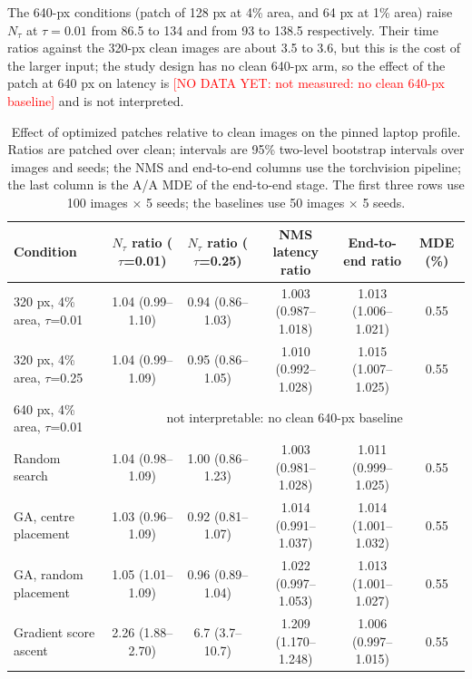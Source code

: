 \documentclass[a4paper,fleqn]{cas-dc}
\newcommand{\nodata}[1]{\textcolor{red}{[NO DATA YET: #1]}}
\newcommand{\Ntau}{N_{\tau}}
\begin{document}
The 640-px conditions (patch of 128 px at 4\% area, and 64 px at 1\% area) raise $\Ntau$ at $\tau=0.01$ from 86.5 to 134 and from 93 to 138.5 respectively. Their time ratios against the 320-px clean images are about 3.5 to 3.6, but this is the cost of the larger input; the study design has no clean 640-px arm, so the effect of the patch at 640 px on latency is \nodata{not measured: no clean 640-px baseline} and is not interpreted.

\begin{table}[t]
\centering\small
\caption{Effect of optimized patches relative to clean images on the pinned laptop profile. Ratios are patched over clean; intervals are 95\% two-level bootstrap intervals over images and seeds; the NMS and end-to-end columns use the torchvision pipeline; the last column is the A/A MDE of the end-to-end stage. The first three rows use 100 images $\times$ 5 seeds; the baselines use 50 images $\times$ 5 seeds.}
\label{tab:patches}
\begin{tabular}{@{}lccccc@{}}
\toprule
Condition & $\Ntau$ ratio ($\tau$=0.01) & $\Ntau$ ratio ($\tau$=0.25) & NMS latency ratio & End-to-end ratio & MDE (\%) \\
\midrule
320 px, 4\% area, $\tau$=0.01 & 1.04 (0.99--1.10) & 0.94 (0.86--1.03) & 1.003 (0.987--1.018) & 1.013 (1.006--1.021) & 0.55 \\
320 px, 4\% area, $\tau$=0.25 & 1.04 (0.99--1.09) & 0.95 (0.86--1.05) & 1.010 (0.992--1.028) & 1.015 (1.007--1.025) & 0.55 \\
640 px, 4\% area, $\tau$=0.01 & \multicolumn{5}{c}{not interpretable: no clean 640-px baseline} \\
Random search & 1.04 (0.98--1.09) & 1.00 (0.86--1.23) & 1.003 (0.981--1.028) & 1.011 (0.999--1.025) & 0.55 \\
GA, centre placement & 1.03 (0.96--1.09) & 0.92 (0.81--1.07) & 1.014 (0.991--1.037) & 1.014 (1.001--1.032) & 0.55 \\
GA, random placement & 1.05 (1.01--1.09) & 0.96 (0.89--1.04) & 1.022 (0.997--1.053) & 1.013 (1.001--1.027) & 0.55 \\
Gradient score ascent & 2.26 (1.88--2.70) & 6.7 (3.7--10.7) & 1.209 (1.170--1.248) & 1.006 (0.997--1.015) & 0.55 \\
\bottomrule
\end{tabular}
\end{table}
\end{document}
